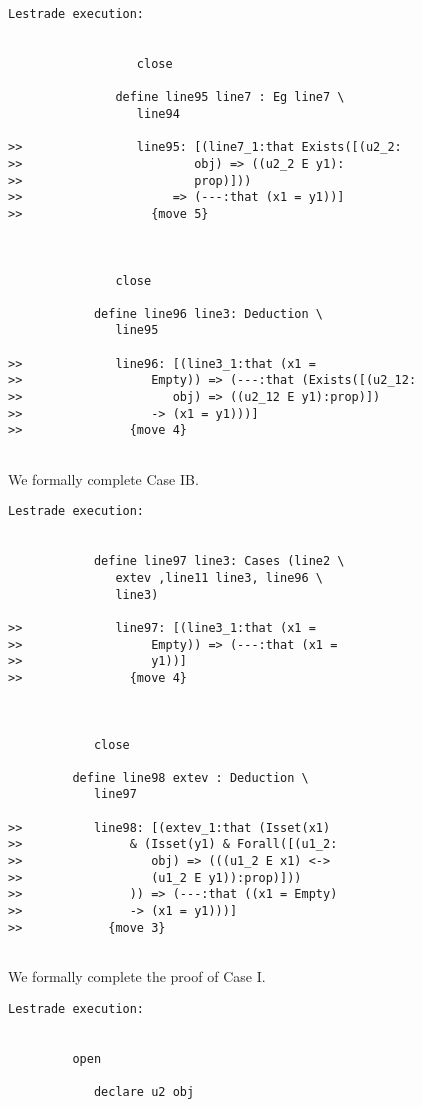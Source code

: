 \documentclass{article}
\begin{document}
{\begin{verbatim}Lestrade execution:


                  close

               define line95 line7 : Eg line7 \
                  line94

>>                line95: [(line7_1:that Exists([(u2_2:
>>                        obj) => ((u2_2 E y1):
>>                        prop)]))
>>                     => (---:that (x1 = y1))]
>>                  {move 5}



               close

            define line96 line3: Deduction \
               line95

>>             line96: [(line3_1:that (x1 =
>>                  Empty)) => (---:that (Exists([(u2_12:
>>                     obj) => ((u2_12 E y1):prop)])
>>                  -> (x1 = y1)))]
>>               {move 4}


\end{verbatim}

We formally complete Case IB.

\begin{verbatim}Lestrade execution:


            define line97 line3: Cases (line2 \
               extev ,line11 line3, line96 \
               line3)

>>             line97: [(line3_1:that (x1 =
>>                  Empty)) => (---:that (x1 =
>>                  y1))]
>>               {move 4}



            close

         define line98 extev : Deduction \
            line97

>>          line98: [(extev_1:that (Isset(x1)
>>               & (Isset(y1) & Forall([(u1_2:
>>                  obj) => (((u1_2 E x1) <->
>>                  (u1_2 E y1)):prop)]))
>>               )) => (---:that ((x1 = Empty)
>>               -> (x1 = y1)))]
>>            {move 3}


\end{verbatim}

We formally complete the proof of Case I.

\begin{verbatim}Lestrade execution:


         open

            declare u2 obj


\end{verbatim}}
\end{document}
